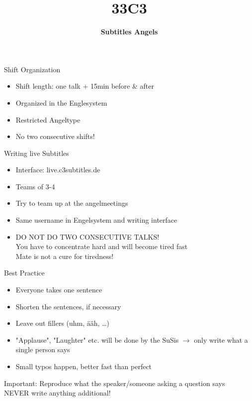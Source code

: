 \documentclass[utf8,widescreen]{beamer}
\title{\Huge \textbf{33C3}}
\subtitle{\Large \textbf{Subtitles Angels}}
\date{}
\begin{document}
\begin{frame}{\titlepage}
\end{frame}

\begin{frame}{Shift Organization}
\pause
\begin{block}{}
\begin{itemize}\itemsep 14pt
\item{Shift length: one talk + 15min before \& after}
\pause
\item{Organized in the Englesystem}
\pause
\item{Restricted Angeltype}
\pause
\item{No two consecutive shifts!}
\end{itemize}
\end{block}
\end{frame}

\begin{frame}{Writing live Subtitles}
\pause
\begin{block}{}
\begin{itemize}\itemsep 10pt
\item{Interface: live.c3subtitles.de}
\pause
\item{Teams of 3-4}
\pause
\item{Try to team up at the angelmeetings}
\pause
\item{Same username in Engelsystem and writing interface}
\pause
\item{\large DO NOT DO TWO CONSECUTIVE TALKS!\\
\normalsize You have to concentrate hard and will become tired fast\\
Mate is not a cure for tiredness!}
\end{itemize}
\end{block}
\end{frame}

\begin{frame}{Best Practice}
\pause
\begin{block}{}
\begin{itemize}\itemsep 10pt
\item{Everyone takes one sentence}
\pause
\item{Shorten the sentences, if necessary}
\pause
\item{Leave out fillers (uhm, ääh, \dots)}
\pause
\item{"Applause", "Laughter" etc. will be done by the SuSis $\rightarrow$ only write what a single person says}
\pause
\item{Small typos happen, better fast than perfect}
\end{itemize}
\pause
\end{block}
\begin{block}{Important:}
Reproduce what the speaker/someone asking a question says\\
NEVER write anything additional!
\end{block}
\end{frame}
\end{document}
